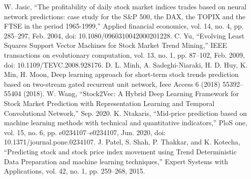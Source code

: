 \documentclass[conference]{IEEEtran}
\begin{document}
\begin{thebibliography}{00}
 W. Jasic, “The profitability of daily stock market indices trades based on neural network predictions: case study for the S\&P 500, the DAX, the TOPIX and the FTSE in the period 1965-1999,” Applied financial economics, vol. 14, no. 4, pp. 285–297, Feb. 2004, doi: 10.1080/0960310042000201228.
 C. Yu, “Evolving Least Squares Support Vector Machines for Stock Market Trend Mining,” IEEE transactions on evolutionary computation, vol. 13, no. 1, pp. 87–102, Feb. 2009, doi: 10.1109/TEVC.2008.928176.
 D. L. Minh, A. Sadeghi-Niaraki, H. D. Huy, K. Min, H. Moon, Deep learning approach
for short-term stock trends prediction based on two-stream gated recurrent unit network,
Ieee Access 6 (2018) 55392–55404 (2018).
 W. Wang, “Stock2Vec: A Hybrid Deep Learning Framework for Stock Market Prediction with Representation Learning and Temporal Convolutional Network,” Sep. 2020.
 K. Ntakaris, “Mid-price prediction based on machine learning methods with technical and quantitative indicators,” PloS one, vol. 15, no. 6, pp. e0234107–e0234107, Jun. 2020, doi: 10.1371/journal.pone.0234107.
 J. Patel, S. Shah, P. Thakkar, and K. Kotecha, “Predicting stock and stock price index movement using Trend Deterministic Data Preparation and machine learning techniques,” Expert Systems with Applications, vol. 42, no. 1, pp. 259–268, 2015. 
\vspace{12pt}
\end{thebibliography}
\end{document}
